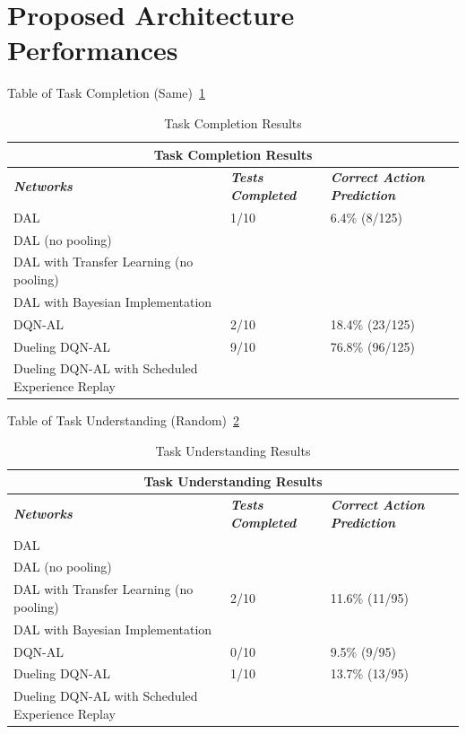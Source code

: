 \documentclass[12pt,american]{report}
\begin{document}
\section{Proposed Architecture Performances}
Table of Task Completion (Same)~\ref{tab:task-complete}
\begin{table}[]
\centering
\caption{Task Completion Results}
\label{tab:task-complete}
\begin{tabular}{|l|l|l|}
\hline
\multicolumn{3}{|c|}{Task Completion Results} \\ \hline
\textit{\textbf{Networks}} & \textit{\textbf{Tests Completed}} & \textit{\textbf{Correct Action Prediction}} \\ \hline
DAL & 1/10  & 6.4\% (8/125) \\ \hline
DAL (no pooling) &  &  \\ \hline
DAL with Transfer Learning (no pooling) &  &  \\ \hline
DAL with Bayesian Implementation &  &  \\ \hline
DQN-AL & 2/10 & 18.4\% (23/125) \\ \hline
Dueling DQN-AL & 9/10 & 76.8\% (96/125) \\ \hline
Dueling DQN-AL with Scheduled Experience Replay & &  \\ \hline
\end{tabular}
\end{table}

Table of Task Understanding (Random)~\ref{tab:task-understanding}
\begin{table}[]
\centering
\caption{Task Understanding Results}
\label{tab:task-understanding}
\begin{tabular}{|l|l|l|}
\hline
\multicolumn{3}{|c|}{Task Understanding Results} \\ \hline
\textit{\textbf{Networks}} & \textit{\textbf{Tests Completed}} & \textit{\textbf{Correct Action Prediction}} \\ \hline
DAL &  &  \\ \hline
DAL (no pooling) &  &  \\ \hline
DAL with Transfer Learning (no pooling) & 2/10 & 11.6\% (11/95) \\ \hline
DAL with Bayesian Implementation &  &  \\ \hline
DQN-AL & 0/10 & 9.5\% (9/95) \\ \hline
Dueling DQN-AL & 1/10 & 13.7\% (13/95) \\ \hline
Dueling DQN-AL with Scheduled Experience Replay & &  \\ \hline
\end{tabular}
\end{table}
\end{document}
